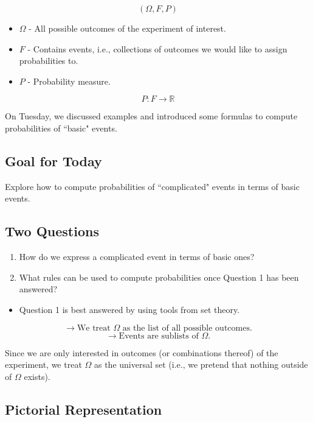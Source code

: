 \documentclass{article}
\begin{document}
\[
(\Omega, F, P)
\]

\begin{itemize}
    \item \(\Omega\) - All possible outcomes of the experiment of interest.
    \item \(F\) - Contains events, i.e., collections of outcomes we would like to assign probabilities to.
    \item \(P\) - Probability measure.
\end{itemize}

\[
P: F \rightarrow \mathbb{R}
\]

On Tuesday, we discussed examples and introduced some formulas to compute probabilities of ``basic" events.

\subsection*{Goal for Today}

Explore how to compute probabilities of ``complicated" events in terms of basic events.

\subsection*{Two Questions}

\begin{enumerate}
    \item How do we express a complicated event in terms of basic ones?
    \item What rules can be used to compute probabilities once Question 1 has been answered?
\end{enumerate}

\begin{itemize}
    \item Question 1 is best answered by using tools from set theory.
\end{itemize}

\[
\rightarrow \text{We treat } \Omega \text{ as the list of all possible outcomes.}
\]
\[
\rightarrow \text{Events are sublists of } \Omega.
\]

Since we are only interested in outcomes (or combinations thereof) of the experiment, we treat \(\Omega\) as the universal set (i.e., we pretend that nothing outside of \(\Omega\) exists).

\subsection*{Pictorial Representation}
\end{document}
